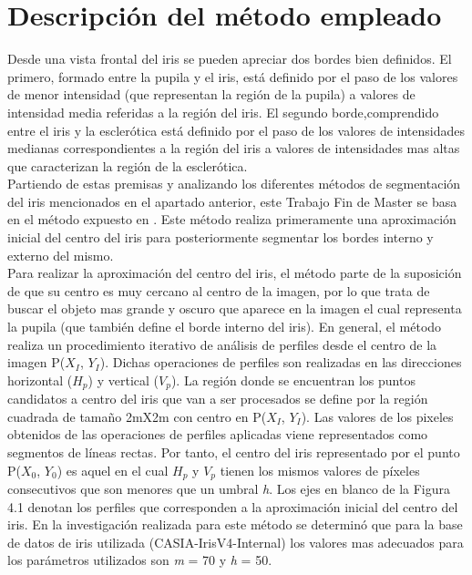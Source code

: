 
\section{Descripción del método empleado}

Desde una vista frontal del iris se pueden apreciar dos bordes bien definidos. El primero, formado entre la pupila y el iris, está definido por el paso de los valores de menor intensidad (que representan la región de la pupila) a valores de intensidad media referidas a la región del iris. El segundo borde,comprendido entre el iris y la esclerótica está definido por el paso de los valores de intensidades medianas correspondientes a la región del iris a valores de intensidades mas altas que caracterizan la región de la esclerótica. \\

Partiendo de estas premisas y analizando los diferentes métodos de segmentación del iris mencionados en el apartado anterior, este Trabajo Fin de Master se basa en el método expuesto en \cite{Reference9}. Este método realiza primeramente una aproximación inicial del centro del iris para posteriormente segmentar los bordes interno y externo del mismo. \\

Para realizar la aproximación del centro del iris, el método parte de la suposición de que su centro es muy cercano al centro de la imagen, por lo que trata de buscar el objeto mas grande y oscuro que aparece en la imagen el cual representa la pupila (que también define el borde interno del iris). En general, el método realiza un procedimiento iterativo de análisis de perfiles desde el centro de la imagen P($X_{I}$, $Y_{I}$). Dichas operaciones de perfiles son realizadas en las direcciones horizontal ($H_{p}$) y vertical ($V_{p}$). La región donde se encuentran los puntos candidatos a centro del iris que van a ser procesados se define por la región cuadrada de tamaño 2mX2m con centro en P($X_{I}$, $Y_{I}$). Las valores de los pixeles obtenidos de las operaciones de perfiles aplicadas viene representados como segmentos de líneas rectas. Por tanto, el centro del iris representado por el punto P($X_{0}$, $Y_{0}$) es aquel en el cual $H_{p}$ y $V_{p}$ tienen los mismos valores de píxeles consecutivos que son menores que un umbral \textit{h}. Los ejes en blanco de la Figura 4.1 denotan los perfiles que corresponden a la aproximación inicial del centro del iris. En la investigación realizada para este método se determinó que para la base de datos de iris utilizada (CASIA-IrisV4-Internal) los valores mas adecuados para los parámetros utilizados son \textit{m} = 70 y \textit{h} = 50. \\

